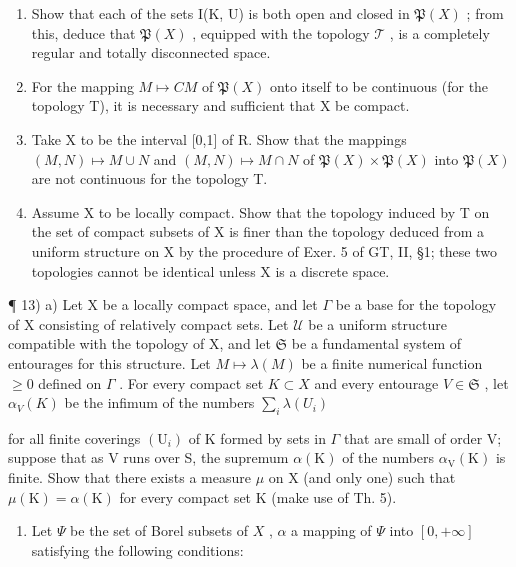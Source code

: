 \begin{enumerate}
\def\labelenumi{\alph{enumi})}
\item
  Show that each of the sets I(K, U) is both open and closed in \(\mathfrak{P}(X)\) ; from this, deduce that \(\mathfrak{P}(X)\) , equipped with the topology \(\mathcal{T}\) , is a completely regular and totally disconnected space.
\item
  For the mapping \(M \mapsto CM\) of \(\mathfrak{P}(X)\) onto itself to be continuous (for the topology T), it is necessary and sufficient that X be compact.
\item
  Take X to be the interval {[}0,1{]} of R. Show that the mappings \((M,N)\mapsto M\cup N\) and \((M,N)\mapsto M\cap N\) of \(\mathfrak{P}(X)\times\mathfrak{P}(X)\) into \(\mathfrak{P}(X)\) are not continuous for the topology T.
\item
  Assume X to be locally compact. Show that the topology induced by T on the set of compact subsets of X is finer than the topology deduced from a uniform structure on X by the procedure of Exer. 5 of GT, II, §1; these two topologies cannot be identical unless X is a discrete space.
\end{enumerate}

¶ 13) a) Let X be a locally compact space, and let \(\Gamma\) be a base for the topology of X consisting of relatively compact sets. Let \(\mathcal{U}\) be a uniform structure compatible with the topology of X, and let \(\mathfrak{S}\) be a fundamental system of entourages for this structure. Let \(M \mapsto \lambda(M)\) be a finite numerical function \(\geqslant 0\) defined on \(\Gamma\) . For every compact set \(K \subset X\) and every entourage \(V \in \mathfrak{S}\) , let \(\alpha_V(K)\) be the infimum of the numbers \(\sum_{i} \lambda(U_i)\)

for all finite coverings \((\mathrm{U}_{i})\) of K formed by sets in \(\Gamma\) that are small of order V; suppose that as V runs over S, the supremum \(\alpha(\mathrm{K})\) of the numbers \(\alpha_{\mathrm{V}}(\mathrm{K})\) is finite. Show that there exists a measure \(\mu\) on X (and only one) such that \(\mu(\mathrm{K}) = \alpha(\mathrm{K})\) for every compact set K (make use of Th. 5).

\begin{enumerate}
\def\labelenumi{\alph{enumi})}
\setcounter{enumi}{1}
\tightlist
\item
  Let \(\Psi\) be the set of Borel subsets of \(X\) , \(\alpha\) a mapping of \(\Psi\) into \([0, +\infty]\) satisfying the following conditions:
\end{enumerate}

